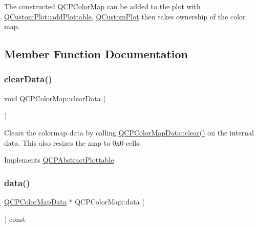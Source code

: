 The constructed \mbox{\hyperlink{class_q_c_p_color_map}{Q\+C\+P\+Color\+Map}} can be added to the plot with \mbox{\hyperlink{class_q_custom_plot_ab7ad9174f701f9c6f64e378df77927a6}{Q\+Custom\+Plot\+::add\+Plottable}}, \mbox{\hyperlink{class_q_custom_plot}{Q\+Custom\+Plot}} then takes ownership of the color map. 

\subsection{Member Function Documentation}
\mbox{\label{class_q_c_p_color_map_a0545dce5383766885912331705a8e099}} 
\subsubsection{\texorpdfstring{clear\+Data()}{clearData()}}
{\footnotesize\ttfamily void Q\+C\+P\+Color\+Map\+::clear\+Data (\begin{DoxyParamCaption}{ }\end{DoxyParamCaption})\hspace{0.3cm}{\ttfamily [virtual]}}

Clears the colormap data by calling \mbox{\hyperlink{class_q_c_p_color_map_data_a9910ba830e96955bd5c8e5bef1e77ef3}{Q\+C\+P\+Color\+Map\+Data\+::clear()}} on the internal data. This also resizes the map to 0x0 cells. 

Implements \mbox{\hyperlink{class_q_c_p_abstract_plottable_a86e5b8fd4b6ff4f4084e7ea4c573fc53}{Q\+C\+P\+Abstract\+Plottable}}.

\mbox{\label{class_q_c_p_color_map_a047d7eb3ae657f93f2f39b5e68b79451}} 
\subsubsection{\texorpdfstring{data()}{data()}}
{\footnotesize\ttfamily \mbox{\hyperlink{class_q_c_p_color_map_data}{Q\+C\+P\+Color\+Map\+Data}} $\ast$ Q\+C\+P\+Color\+Map\+::data (\begin{DoxyParamCaption}{ }\end{DoxyParamCaption}) const\hspace{0.3cm}{\ttfamily [inline]}}


